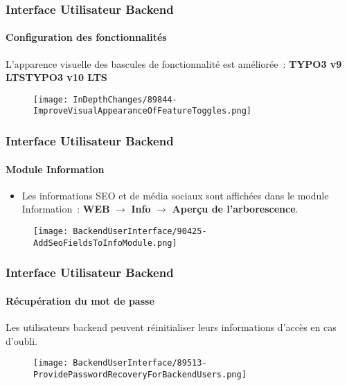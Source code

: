 
\begin{frame}[fragile]
	\frametitle{Interface Utilisateur Backend}
	\framesubtitle{Configuration des fonctionnalités}

	L'apparence visuelle des bascules de fonctionnalité est améliorée~:
	\newline\newline
	\smaller\textbf{TYPO3 v9 LTS}\tabto{6cm}\textbf{TYPO3 v10 LTS}\normalsize

	\begin{figure}
		\texttt{[image: InDepthChanges/89844-ImproveVisualAppearanceOfFeatureToggles.png]}
	\end{figure}

\end{frame}


\begin{frame}[fragile]
	\frametitle{Interface Utilisateur Backend}
	\framesubtitle{Module Information}

	\begin{itemize}
		\item Les informations SEO et de média sociaux sont affichées dans le module Information~:\newline
			\textbf{WEB} $\rightarrow$ \textbf{Info} $\rightarrow$ \textbf{Aperçu de l'arborescence}.
	\end{itemize}

	\begin{figure}
		\texttt{[image: BackendUserInterface/90425-AddSeoFieldsToInfoModule.png]}
	\end{figure}

\end{frame}


\begin{frame}[fragile]
	\frametitle{Interface Utilisateur Backend}
	\framesubtitle{Récupération du mot de passe}

	Les utilisateurs backend peuvent réinitialiser leurs informations d'accès en cas d'oubli.

	\begin{figure}
		\texttt{[image: BackendUserInterface/89513-ProvidePasswordRecoveryForBackendUsers.png]}
	\end{figure}

\end{frame}

